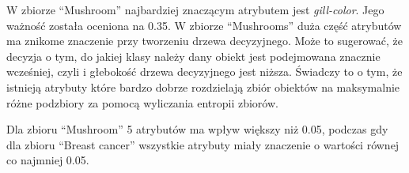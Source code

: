 W zbiorze ``Mushroom'' najbardziej znaczącym atrybutem jest \textit{gill-color}.
Jego ważność została oceniona na 0.35. W zbiorze ``Mushrooms'' duża część
atrybutów ma znikome znaczenie przy tworzeniu drzewa decyzyjnego. Może to
sugerować, że decyzja o tym, do jakiej klasy należy dany obiekt jest podejmowana
znacznie wcześniej, czyli i głebokość drzewa decyzyjnego jest niższa. Świadczy
to o tym, że istnieją atrybuty które bardzo dobrze rozdzielają zbiór obiektów
na maksymalnie różne podzbiory za pomocą wyliczania entropii zbiorów.

Dla zbioru ``Mushroom'' 5 atrybutów ma wpływ większy niż 0.05, podczas gdy dla
zbioru ``Breast cancer'' wszystkie atrybuty miały znaczenie o wartości
równej co najmniej 0.05.
